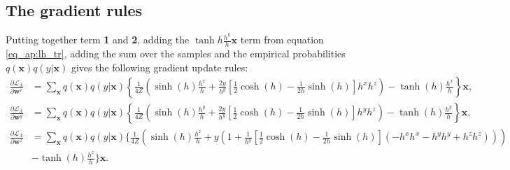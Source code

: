 \subsection*{The gradient rules}
Putting together term \textbf{1} and \textbf{2}, adding the $\tanh{h}\frac{h^k}{h}\mathbf{x}$ term from equation \ref{eq_ap:lh_tr}, adding the sum over the samples and the empirical probabilities $q(\mathbf{x})q(y|\mathbf{x})$ gives the following gradient update rules:
\begin{align*}
    \frac{\partial \mathcal{L}_\Lambda }{\partial \mathbf{w}^x}&= \sum_\mathbf{x} q(\mathbf{x})q(y|\mathbf{x}) \left\{\frac{1}{4Z} \left(\sinh(h)\frac{h^x}{h} + \frac{2y}{h^y}\left[ \frac{1}{2}\cosh(h) - \frac{1}{2h}\sinh(h) \right]h^xh^z \right) - \tanh(h)\frac{h^x}{h}\right\}\mathbf{x},\\
    \frac{\partial \mathcal{L}_\Lambda }{\partial \mathbf{w}^y} &= \sum_\mathbf{x} q(\mathbf{x})q(y|\mathbf{x}) \left\{\frac{1}{4Z}  \left(\sinh(h)\frac{h^y}{h} + \frac{2y}{h^y}\left[  \frac{1}{2}\cosh(h) - \frac{1}{2h}\sinh(h) \right]h^yh^z \right) - \tanh(h)\frac{h^y}{h}\right\}\mathbf{x},\\
    \frac{\partial \mathcal{L}_\Lambda }{\partial \mathbf{w}^z} &= \sum_\mathbf{x} q(\mathbf{x})q(y|\mathbf{x})\bigg\{\frac{1}{4Z} \left(\sinh(h)\frac{h^z}{h} + y\left(1 + \frac{1}{h^y}\left[  \frac{1}{2}\cosh(h) - \frac{1}{2h}\sinh(h) \right](-h^x h^x - h^y h^y + h^z h^z)\right)\right)\\ 
    &- \tanh(h)\frac{h^z}{h}\bigg\}\mathbf{x}.
\end{align*}